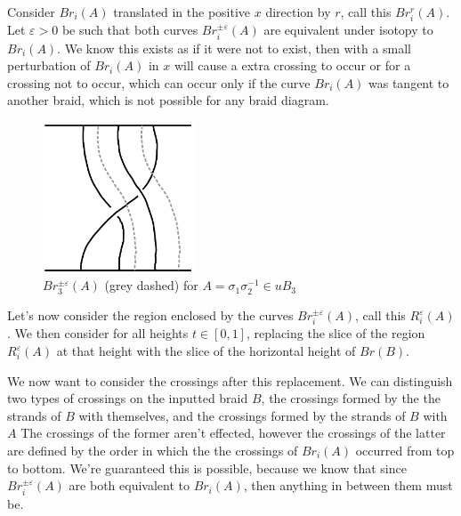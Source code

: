 Consider \( Br_i(A) \) translated in the positive \( x \) direction by \( r \), call this \( Br_i^r(A) \). 
Let \( \varepsilon > 0 \) be such that both curves \( Br_i^{\pm\varepsilon}(A) \) are equivalent under isotopy to \( Br_i(A) \). 
We know this exists as if it were not to exist, then with a small perturbation of \( Br_i(A) \) in \( x \) will cause a extra crossing to occur or for a crossing not to occur, which can occur only if the curve \( Br_i(A) \) was tangent to another braid, which is not possible for any braid diagram. 

\begin{figure}[H]
    \centering
    \includegraphics[width=0.4\textwidth]{images/classical_braids/5_classical_braid_composition_region.png}
    \caption{\( Br_3^{\pm\varepsilon}(A) \) (grey dashed) for \( A = \sigma_1 \sigma_2^{-1} \in uB_3 \)}
    \label{fig:classical_composition_region}
\end{figure}

Let's now consider the region enclosed by the curves \( Br_i^{\pm\varepsilon}(A) \), call this \( R_i^{\varepsilon}(A) \). 
We then consider for all heights \( t \in [0, 1] \), replacing the slice of the region \( R_i^\varepsilon(A) \) at that height with the slice of the horizontal height of \( Br(B) \). 

We now want to consider the crossings after this replacement.
We can distinguish two types of crossings on the inputted braid \( B \), the crossings formed by the the strands of \( B \) with themselves, and the crossings formed by the strands of \( B \) with \( A \)
The crossings of the former aren't effected, however the crossings of the latter are defined by the order in which the the crossings of \( Br_i(A) \) occurred from top to bottom. 
We're guaranteed this is possible, because we know that since \( Br_i^{\pm\varepsilon}(A) \) are both equivalent to \( Br_i(A) \), then anything in between them must be. 

